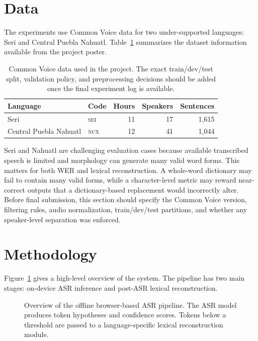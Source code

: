 \documentclass[11pt]{article}
\newcommand{\sei}{\textsc{sei}}
\newcommand{\ncx}{\textsc{ncx}}
\begin{document}
\section{Data}

The experiments use Common Voice data for two under-supported languages: Seri and Central Puebla Nahuatl. Table~\ref{tab:data} summarizes the dataset information available from the project poster.

\begin{table}[t]
\centering
\small
\begin{tabular}{@{}llrrr@{}}
\toprule
Language & Code & Hours & Speakers & Sentences \\
\midrule
Seri & \sei & 11 & 17 & 1,615 \\
Central Puebla Nahuatl & \ncx & 12 & 41 & 1,044 \\
\bottomrule
\end{tabular}
\caption{Common Voice data used in the project. The exact train/dev/test split, validation policy, and preprocessing decisions should be added once the final experiment log is available.}
\label{tab:data}
\end{table}

Seri and Nahuatl are challenging evaluation cases because available transcribed speech is limited and morphology can generate many valid word forms. This matters for both WER and lexical reconstruction. A whole-word dictionary may fail to contain many valid forms, while a character-level metric may reward near-correct outputs that a dictionary-based replacement would incorrectly alter. Before final submission, this section should specify the Common Voice version, filtering rules, audio normalization, train/dev/test partitions, and whether any speaker-level separation was enforced.

\section{Methodology}

Figure~\ref{fig:pipeline} gives a high-level overview of the system. The pipeline has two main stages: on-device ASR inference and post-ASR lexical reconstruction.

\begin{figure}[t]
\centering
{}
\caption{Overview of the offline browser-based ASR pipeline. The ASR model produces token hypotheses and confidence scores. Tokens below a threshold are passed to a language-specific lexical reconstruction module.}
\label{fig:pipeline}
\end{figure}
\end{document}
